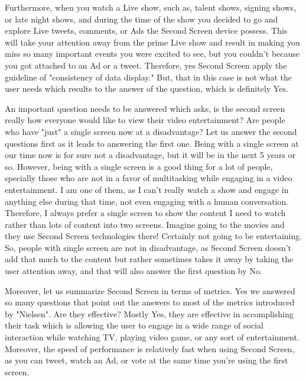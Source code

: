 \documentclass[12pt, oneside]{amsart}   	%
\begin{document}
 Furthermore, when you watch a Live show, such as, talent shows, signing shows, or late night shows, and during the time of the show you decided to go and explore Live tweets, comments, or Ads the Second Screen device possess.  This will take your attention away from the prime Live show and result in making you miss so many important events you were excited to see, but you couldn't because you got attached to an Ad or a tweet\cite{BenifitsAndImpacts}.  Therefore, yes Second Screen apply the guideline of "consistency of data display."  But, that in this case is not what the user needs which results to the answer of the question, which is definitely Yes. 
  
  An important question needs to be answered which asks, is the second screen really how everyone would like to view their video entertainment? Are people who have "just" a single screen now at a disadvantage?  Let us answer the second questions first as it leads to answering the first one.  Being with a single screen at our time now is for sure not a disadvantage, but it will be in the next 5 years or so.  However, being with a single screen is a good thing for a lot of people, specially those who are not in a favor of multitasking while engaging in a video entertainment.  I am one of them, as I can't really watch a show and engage in anything else during that time, not even engaging with a human conversation. Therefore, I always prefer a single screen to show the content I need to watch rather than lots of content into two screens.  Imagine going to the movies and they use Second Screen technologies there! Certainly not going to be entertaining. So, people with single screen are not in disadvantage, as Second Screen doesn't add that much to the content but rather sometimes takes it away by taking the user attention away, and that will also answer the first question by No.
  
 Moreover, let us summarize Second Screen in terms of metrics.  Yes we answered so many questions that point out the answers to most of the metrics introduced by "Nielsen". %
Are they effective? Mostly Yes, they are  effective in accomplishing their task which is allowing the user to engage in a wide range of social interaction while watching TV, playing video game, or any sort of entertainment.  Moreover, the speed of performance is relatively fast when using Second Screen, as you can tweet, watch an Ad, or vote at the same time you're using the first screen.
 
\end{document}
